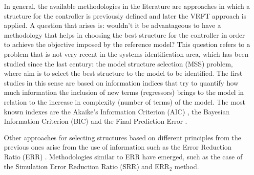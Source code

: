 	In general, the available methodologies in the literature are approaches in which a structure for the controller is previously defined and later the VRFT approach is applied.
	A question that arises is: wouldn't it be advantageous to have a methodology that helps in choosing the best structure for the controller in order to achieve the objective imposed by the reference model? This question refers to a problem that is not very recent in the systems identification area, which has been studied since the last century: the model structure selection (MSS) problem, where aim is to select the best structure to the model to be identified.
	The first studies in this sense are based on information indices that try to quantify how much information the inclusion of new terms (regressors) brings to the model in relation to the increase in complexity (number of terms) of the model.
	The most known indexes are the Akaike's Information Criterion (AIC) \citet{akaike1974}, the Bayesian Information Criterion (BIC) \citep{schwarz1978} and the Final Prediction Error \citep {kashyap1977}.

	Other approaches for selecting structures based on different principles from the previous ones arise from the use of information such as the Error Reduction Ratio (ERR) \citep{billings1989}.
	Methodologies similar to ERR have emerged, such as the case of the Simulation Error Reduction Ratio (SRR) \citep{piroddi2003} and ERR$_2$ \citep{alves2012} method.

